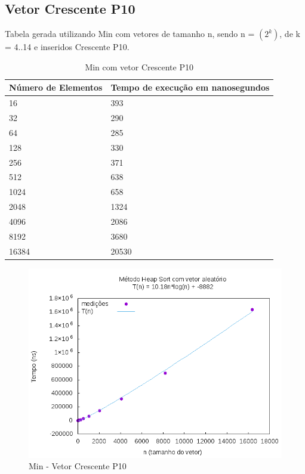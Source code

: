 \documentclass[12pt,a4paper,twoside]{report}
\begin{document}
\subsection{Vetor Crescente P10}
Tabela gerada utilizando Min com vetores de tamanho n, sendo n = $(2^k)$, de k = 4..14 e inseridos Crescente P10.
\begin{table}[H]
\centering
\caption{Min com vetor Crescente P10}
\label{my-label}
\begin{tabular}{|l|l|}
\hline
\multicolumn{1}{|c|}{\textbf{Número de Elementos}} & \multicolumn{1}{c|}{\textbf{Tempo de execução em nanosegundos}} \\ \hline
16 & 393 \\ \hline
32 & 290 \\ \hline
64 & 285 \\ \hline
128 & 330 \\ \hline
256 & 371 \\ \hline
512 & 638 \\ \hline
1024 & 658 \\ \hline
2048 & 1324 \\ \hline
4096 & 2086 \\ \hline
8192 & 3680 \\ \hline
16384 & 20530 \\ \hline

\end{tabular}
\end{table}

\begin{figure}[H]
    \centering
    \includegraphics[width=0.7\linewidth]{graficos/HeapSort/vIntAleatorio/vIntAleatorio.png}
  \caption{Min - Vetor Crescente P10}
\end{figure}
\end{document}
